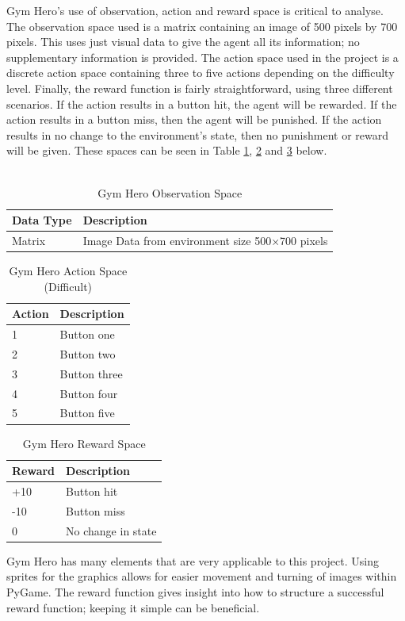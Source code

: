 \documentclass[a4paper,12pt]{article}
\begin{document}
\noindent
Gym Hero's use of observation, action and reward space is critical to analyse. The observation space used is a matrix containing an image of 500 pixels by 700 pixels. This uses just visual data to give the agent all its information; no supplementary information is provided. The action space used in the project is a discrete action space containing three to five actions depending on the difficulty level. Finally, the reward function is fairly straightforward, using three different scenarios. If the action results in a button hit, the agent will be rewarded. If the action results in a  button miss, then the agent will be punished. If the action results in no change to the environment's state, then no punishment or reward will be given. These spaces can be seen in Table \ref{tab:Gym Hero Observation Space}, \ref{tab:Gym Hero Action Space} and \ref{tab:Gym Hero Reward Space} below.
\\\\
\begin{table}[H]
\centering
\caption{Gym Hero Observation Space}
\label{tab:Gym Hero Observation Space}
\begin{tabular}{|ll|}
\hline
\textbf{Data Type} & \textbf{Description}\\ \hline
Matrix & Image Data from environment size 500$\times$700 pixels\\ \hline
\end{tabular}
\end{table}

\begin{table}[H]
\centering
\caption{Gym Hero Action Space (Difficult)}
\label{tab:Gym Hero Action Space}
\begin{tabular}{|ll|}
\hline
\textbf{Action} & \textbf{Description}\\ \hline
1 & Button one \\ \hline
2 & Button two \\ \hline
3 & Button three \\ \hline
4 & Button four \\ \hline
5 & Button five \\ \hline
\end{tabular}
\end{table}

\begin{table}[H]
\centering
\caption{Gym Hero Reward Space}
\label{tab:Gym Hero Reward Space}
\begin{tabular}{|ll|}
\hline
\textbf{Reward} & \textbf{Description}\\ \hline
+10 & Button hit \\ \hline
-10 & Button miss \\ \hline
0 & No change in state \\ \hline
\end{tabular}
\end{table}
\noindent
Gym Hero has many elements that are very applicable to this project. Using sprites for the graphics allows for easier movement and turning of images within PyGame. The reward function gives insight into how to structure a successful reward function; keeping it simple can be beneficial. 
\\\\
\end{document}
